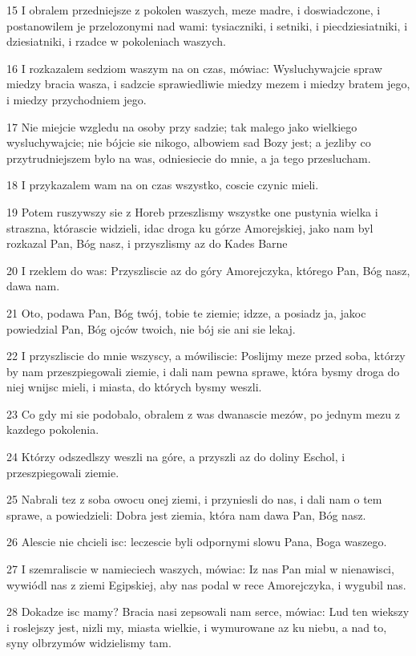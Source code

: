 \par 15 I obralem przedniejsze z pokolen waszych, meze madre, i doswiadczone, i postanowilem je przelozonymi nad wami: tysiaczniki, i setniki, i piecdziesiatniki, i dziesiatniki, i rzadce w pokoleniach waszych.
\par 16 I rozkazalem sedziom waszym na on czas, mówiac: Wysluchywajcie spraw miedzy bracia wasza, i sadzcie sprawiedliwie miedzy mezem i miedzy bratem jego, i miedzy przychodniem jego.
\par 17 Nie miejcie wzgledu na osoby przy sadzie; tak malego jako wielkiego wysluchywajcie; nie bójcie sie nikogo, albowiem sad Bozy jest; a jezliby co przytrudniejszem bylo na was, odniesiecie do mnie, a ja tego przeslucham.
\par 18 I przykazalem wam na on czas wszystko, coscie czynic mieli.
\par 19 Potem ruszywszy sie z Horeb przeszlismy wszystke one pustynia wielka i straszna, którascie widzieli, idac droga ku górze Amorejskiej, jako nam byl rozkazal Pan, Bóg nasz, i przyszlismy az do Kades Barne
\par 20 I rzeklem do was: Przyszliscie az do góry Amorejczyka, którego Pan, Bóg nasz, dawa nam.
\par 21 Oto, podawa Pan, Bóg twój, tobie te ziemie; idzze, a posiadz ja, jakoc powiedzial Pan, Bóg ojców twoich, nie bój sie ani sie lekaj.
\par 22 I przyszliscie do mnie wszyscy, a mówiliscie: Poslijmy meze przed soba, którzy by nam przeszpiegowali ziemie, i dali nam pewna sprawe, która bysmy droga do niej wnijsc mieli, i miasta, do których bysmy weszli.
\par 23 Co gdy mi sie podobalo, obralem z was dwanascie mezów, po jednym mezu z kazdego pokolenia.
\par 24 Którzy odszedlszy weszli na góre, a przyszli az do doliny Eschol, i przeszpiegowali ziemie.
\par 25 Nabrali tez z soba owocu onej ziemi, i przyniesli do nas, i dali nam o tem sprawe, a powiedzieli: Dobra jest ziemia, która nam dawa Pan, Bóg nasz.
\par 26 Alescie nie chcieli isc: leczescie byli odpornymi slowu Pana, Boga waszego.
\par 27 I szemraliscie w namieciech waszych, mówiac: Iz nas Pan mial w nienawisci, wywiódl nas z ziemi Egipskiej, aby nas podal w rece Amorejczyka, i wygubil nas.
\par 28 Dokadze isc mamy? Bracia nasi zepsowali nam serce, mówiac: Lud ten wiekszy i roslejszy jest, nizli my, miasta wielkie, i wymurowane az ku niebu, a nad to, syny olbrzymów widzielismy tam.
